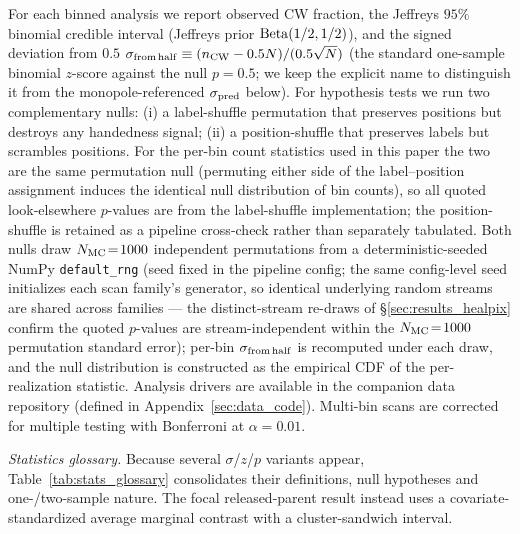\documentclass[twocolumn,linenumbers]{aastex702}
\begin{document}
For each binned analysis we report observed CW fraction, the Jeffreys
$95\%$ binomial credible interval (Jeffreys prior
${\rm Beta}(1/2,1/2)$), and the signed deviation from $0.5$
$\sigma_{\rm from\,half} \equiv (n_{\rm CW} - 0.5 N)/(0.5\sqrt{N})$
(the standard one-sample binomial $z$-score against the null
$p = 0.5$; we keep the explicit name to distinguish it from the
monopole-referenced $\sigma_{\rm pred}$ below).
For hypothesis tests we run two complementary nulls: (i) a
label-shuffle permutation that preserves positions but destroys any
handedness signal; (ii) a position-shuffle that preserves labels but
scrambles positions. For the per-bin count statistics used in this
paper the two are the same permutation null (permuting either side of
the label--position assignment induces the identical null
distribution of bin counts), so all quoted look-elsewhere $p$-values
are from the label-shuffle implementation; the position-shuffle is
retained as a pipeline cross-check rather than separately tabulated. Both nulls draw $N_{\rm MC}\!=\!1000$
independent permutations from a deterministic-seeded NumPy
\texttt{default\_rng} (seed fixed in the pipeline config; the same
config-level seed initializes each scan family's generator, so
identical underlying random streams are shared across families ---
the distinct-stream re-draws of \S\ref{sec:results_healpix} confirm
the quoted $p$-values are stream-independent within the
$N_{\rm MC}\!=\!1000$ permutation standard error); per-bin
$\sigma_{\rm from\,half}$ is recomputed under each draw, and the
null distribution is constructed as the empirical CDF of the
per-realization statistic. Analysis drivers are available in the
companion data repository (defined in
Appendix~\ref{sec:data_code}). Multi-bin scans are
corrected for multiple testing with Bonferroni at $\alpha\!=\!0.01$.

\emph{Statistics glossary.} Because several $\sigma$/$z$/$p$ variants
appear, Table~\ref{tab:stats_glossary} consolidates their definitions,
null hypotheses and one-/two-sample nature. The focal
released-parent result instead uses a covariate-standardized average
marginal contrast with a cluster-sandwich interval.
\end{document}
